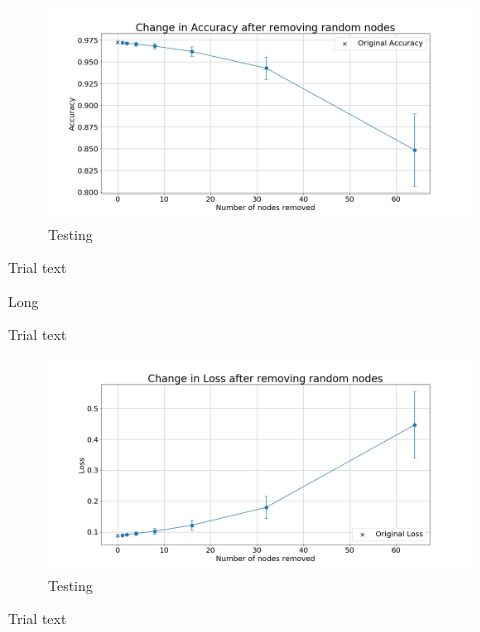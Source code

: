 \documentclass[UKenglish]{ifimaster}
\begin{document}
            \begin{figure}[h!]\centering
                \includegraphics[width=\textwidth]{Accuracy_change_random_removal_mnist.png}
                \caption[Short title]{Testing}
                \label{fig:acc_rn_mnist}
            \end{figure}

            Trial text

            \begin{table}[h!]
                \centering
                \resizebox{\textwidth}{!}{}
                \caption[Short]{Long}
                \label{tab:loss_rnd_rem_mnist}
            \end{table}

            Trial text

            \begin{figure}[h!]\centering
                \includegraphics[width=\textwidth]{Loss_change_random_removal_mnist.png}
                \caption[Short title]{Testing}
                \label{fig:loss_rn_mnist}
            \end{figure}

            Trial text
\end{document}
